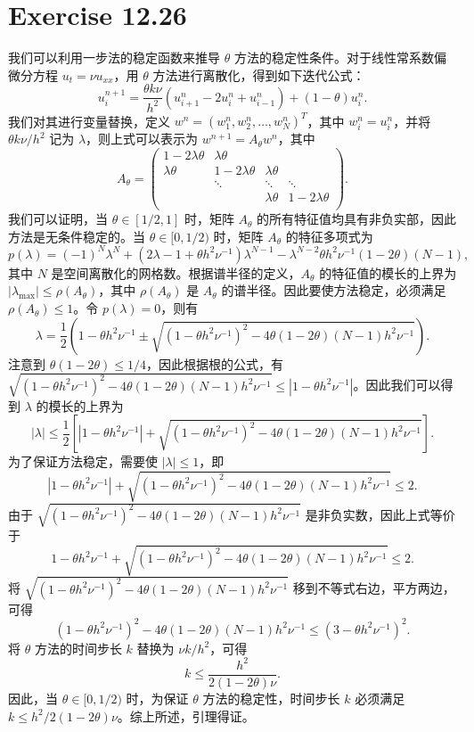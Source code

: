 \documentclass[twoside,a4paper]{article}
\begin{document}
\section{Exercise 12.26}
我们可以利用一步法的稳定函数来推导 $\theta$ 方法的稳定性条件。对于线性常系数偏微分方程 $u_t = \nu u_{xx}$，用 $\theta$ 方法进行离散化，得到如下迭代公式：
$$
u_i^{n+1} = \frac{\theta k\nu}{h^2}(u_{i+1}^n - 2u_i^n + u_{i-1}^n) + (1-\theta)u_i^n.
$$
我们对其进行变量替换，定义 $w^n = (w_1^n,w_2^n,\dots,w_N^n)^T$，其中 $w_i^n = u_i^n$，并将 $\theta k\nu/h^2$ 记为 $\lambda$，则上式可以表示为 $w^{n+1} = A_\theta w^n$，其中
$$
A_\theta = \begin{pmatrix}
1-2\lambda\theta & \lambda\theta & & \\
\lambda\theta & 1-2\lambda\theta & \lambda\theta & \\
& \ddots & \ddots & \ddots \\
& & \lambda\theta & 1-2\lambda\theta \\
\end{pmatrix}.
$$
我们可以证明，当 $\theta\in[1/2,1]$ 时，矩阵 $A_\theta$ 的所有特征值均具有非负实部，因此方法是无条件稳定的。当 $\theta\in[0,1/2)$ 时，矩阵 $A_\theta$ 的特征多项式为
$$
p(\lambda) = (-1)^N\lambda^N + (2\lambda-1+\theta h^2\nu^{-1})\lambda^{N-1} - \lambda^{N-2}\theta h^2\nu^{-1}(1-2\theta)(N-1),
$$
其中 $N$ 是空间离散化的网格数。根据谱半径的定义，$A_\theta$ 的特征值的模长的上界为 $|\lambda_{\max}| \leq \rho(A_\theta)$，其中 $\rho(A_\theta)$ 是 $A_\theta$ 的谱半径。因此要使方法稳定，必须满足 $\rho(A_\theta)\leq 1$。令 $p(\lambda) = 0$，则有
$$
\lambda = \frac{1}{2}\left(1-\theta h^2\nu^{-1}\pm\sqrt{(1-\theta h^2\nu^{-1})^2 - 4\theta(1-2\theta)(N-1)h^2\nu^{-1}}\right).
$$
注意到 $\theta(1-2\theta)\leq 1/4$，因此根据根的公式，有 $\sqrt{(1-\theta h^2\nu^{-1})^2 - 4\theta(1-2\theta)(N-1)h^2\nu^{-1}} \leq |1-\theta h^2\nu^{-1}|$。因此我们可以得到 $\lambda$ 的模长的上界为
$$
|\lambda| \leq \frac{1}{2}\left[|1-\theta h^2\nu^{-1}| + \sqrt{(1-\theta h^2\nu^{-1})^2 - 4\theta(1-2\theta)(N-1)h^2\nu^{-1}}\right].
$$
为了保证方法稳定，需要使 $|\lambda| \leq 1$，即
$$
|1-\theta h^2\nu^{-1}| + \sqrt{(1-\theta h^2\nu^{-1})^2 - 4\theta(1-2\theta)(N-1)h^2\nu^{-1}} \leq 2.
$$
由于 $\sqrt{(1-\theta h^2\nu^{-1})^2 - 4\theta(1-2\theta)(N-1)h^2\nu^{-1}}$ 是非负实数，因此上式等价于
$$
1-\theta h^2\nu^{-1} + \sqrt{(1-\theta h^2\nu^{-1})^2 - 4\theta(1-2\theta)(N-1)h^2\nu^{-1}} \leq 2.
$$
将 $\sqrt{(1-\theta h^2\nu^{-1})^2 - 4\theta(1-2\theta)(N-1)h^2\nu^{-1}}$ 移到不等式右边，平方两边，可得
$$
(1-\theta h^2\nu^{-1})^2 - 4\theta(1-2\theta)(N-1)h^2\nu^{-1} \leq (3-\theta h^2\nu^{-1})^2.
$$
将 $\theta$ 方法的时间步长 $k$ 替换为 $\nu k/h^2$，可得
$$
k \leq \frac{h^2}{2(1-2\theta)\nu}.
$$
因此，当 $\theta\in[0,1/2)$ 时，为保证 $\theta$ 方法的稳定性，时间步长 $k$ 必须满足 $k\leq h^2/2(1-2\theta)\nu$。综上所述，引理得证。
\end{document}
